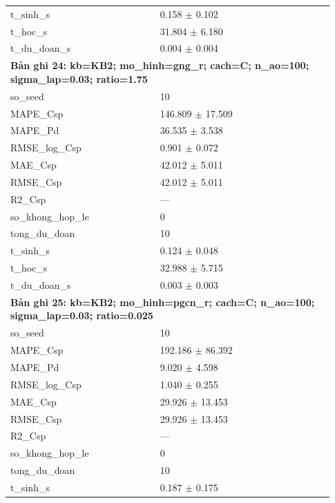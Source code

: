 \begin{longtable}{p{0.43\linewidth}p{0.50\linewidth}}
t\_\allowbreak sinh\_\allowbreak s & 0.158 $\pm$ 0.102 \\
t\_\allowbreak hoc\_\allowbreak s & 31.804 $\pm$ 6.180 \\
t\_\allowbreak du\_\allowbreak doan\_\allowbreak s & 0.004 $\pm$ 0.004 \\
\midrule
\multicolumn{2}{p{0.95\linewidth}}{\textbf{Bản ghi 24: kb=KB2; mo\_hinh=gng\_r; cach=C; n\_ao=100; sigma\_lap=0.03; ratio=1.75}} \\
so\_\allowbreak seed & 10 \\
MAPE\_\allowbreak Csp & 146.809 $\pm$ 17.509 \\
MAPE\_\allowbreak Pd & 36.535 $\pm$ 3.538 \\
RMSE\_\allowbreak log\_\allowbreak Csp & 0.901 $\pm$ 0.072 \\
MAE\_\allowbreak Csp & 42.012 $\pm$ 5.011 \\
RMSE\_\allowbreak Csp & 42.012 $\pm$ 5.011 \\
R2\_\allowbreak Csp & — \\
so\_\allowbreak khong\_\allowbreak hop\_\allowbreak le & 0 \\
tong\_\allowbreak du\_\allowbreak doan & 10 \\
t\_\allowbreak sinh\_\allowbreak s & 0.124 $\pm$ 0.048 \\
t\_\allowbreak hoc\_\allowbreak s & 32.988 $\pm$ 5.715 \\
t\_\allowbreak du\_\allowbreak doan\_\allowbreak s & 0.003 $\pm$ 0.003 \\
\midrule
\multicolumn{2}{p{0.95\linewidth}}{\textbf{Bản ghi 25: kb=KB2; mo\_hinh=pgcn\_r; cach=C; n\_ao=100; sigma\_lap=0.03; ratio=0.025}} \\
so\_\allowbreak seed & 10 \\
MAPE\_\allowbreak Csp & 192.186 $\pm$ 86.392 \\
MAPE\_\allowbreak Pd & 9.020 $\pm$ 4.598 \\
RMSE\_\allowbreak log\_\allowbreak Csp & 1.040 $\pm$ 0.255 \\
MAE\_\allowbreak Csp & 29.926 $\pm$ 13.453 \\
RMSE\_\allowbreak Csp & 29.926 $\pm$ 13.453 \\
R2\_\allowbreak Csp & — \\
so\_\allowbreak khong\_\allowbreak hop\_\allowbreak le & 0 \\
tong\_\allowbreak du\_\allowbreak doan & 10 \\
t\_\allowbreak sinh\_\allowbreak s & 0.187 $\pm$ 0.175 \\

\end{longtable}

